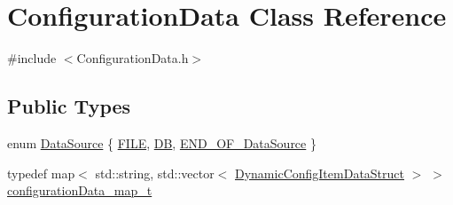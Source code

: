 \hypertarget{classConfigurationData}{}\section{Configuration\+Data Class Reference}
\label{classConfigurationData}


{\ttfamily \#include $<$Configuration\+Data.\+h$>$}

\subsection*{Public Types}
\begin{DoxyCompactItemize}
\item 
enum \hyperlink{classConfigurationData_a6b159be92b02274088a4de34584eeabc}{Data\+Source} \{ \hyperlink{classConfigurationData_a6b159be92b02274088a4de34584eeabca9e0c7b9239487cfb4752209277ac79aa}{F\+I\+LE}, 
\hyperlink{classConfigurationData_a6b159be92b02274088a4de34584eeabca30f2137384653ca12f00f3bc62a807ea}{DB}, 
\hyperlink{classConfigurationData_a6b159be92b02274088a4de34584eeabca38caa02da39a1a3ed2b30b02f3153a8f}{E\+N\+D\+\_\+\+O\+F\+\_\+\+Data\+Source}
 \}
\item 
typedef map$<$ std\+::string, std\+::vector$<$ \hyperlink{structDynamicConfigItemDataStruct}{Dynamic\+Config\+Item\+Data\+Struct} $>$ $>$ \hyperlink{classConfigurationData_a88b45bf304a35e4e78cfce6688087cce}{configuration\+Data\+\_\+map\+\_\+t}
\end{DoxyCompactItemize}
